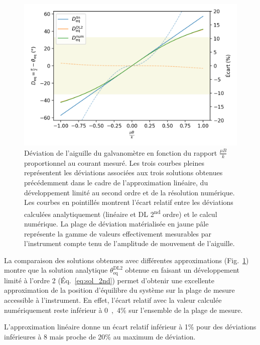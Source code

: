 \documentclass[12pt,a4paper,fleqn]{article}
\begin{document}
\begin{figure}
\includegraphics[scale=1]{deviation.png}
\caption{Déviation de l'aiguille du galvanomètre en fonction du rapport $\tfrac{\mu B}{k}$ proportionnel au courant mesuré.
Les trois courbes pleines représentent les déviations associées aux trois solutions obtenues précédemment dans le cadre de l'approximation linéaire, du développement limité au second ordre et de la résolution numérique.
Les courbes en pointillés montrent l'écart relatif entre les déviations calculées analytiquement (linéaire et DL 2\textsuperscript{nd} ordre) et le calcul numérique.
La plage de déviation matérialisée en jaune pâle représente la gamme de valeurs effectivement mesurables par l'instrument compte tenu de l'amplitude de mouvement de l'aiguille.}
\label{fig:deviation}
\end{figure}

La comparaison des solutions obtenues avec différentes approximations (Fig.~\ref{fig:deviation}) montre que la solution analytique $\theta_\mathrm{eq}^\mathrm{DL2}$ obtenue en faisant un développement limité à l'ordre 2 (Éq.~\ref{eq:sol_2nd}) permet d'obtenir une excellente approximation de la position d'équilibre du système sur la plage de mesure accessible à l'instrument.
En effet, l'écart relatif avec la valeur calculée numériquement reste inférieur à \unit{0{,}4}{\%} sur l'ensemble de la plage de mesure.

L'approximation linéaire donne un écart relatif inférieur à \unit{1}{\%} pour des déviations inférieures à \unit{8}{\degree} mais proche de \unit{20}{\%} au maximum de déviation.
\end{document}
